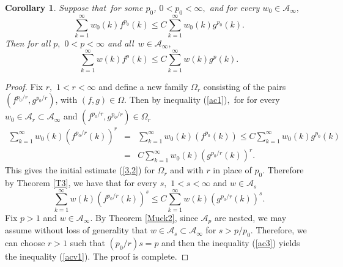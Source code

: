 \documentclass[a4paper]{amsart}
\theoremstyle{plain}
\newtheorem{corollary}{Corollary}[section]
\numberwithin{equation}{section}
\begin{document}
\begin{corollary}
Suppose that\ for some $p_{0}$, $0<p_{0}<\infty ,$ and for every $w_{0}\in 
\mathcal{A}_{\infty },$%
\begin{equation}
\sum_{k=1}^{\infty }w_{0}(k)f^{p_{0}}(k)\leq C\sum_{k=1}^{\infty
}w_{0}(k)g^{p_{0}}(k)\text{.}  \label{ac1}
\end{equation}%
Then for all $p,$ $0<p<\infty $ and all\ $w\in \mathcal{A}_{\infty },$%
\begin{equation}
\sum_{k=1}^{\infty }w(k)f^{p}(k)\leq C\sum_{k=1}^{\infty }w(k)g^{p}(k).
\label{acv1}
\end{equation}
\end{corollary}

\begin{proof}
Fix $r,$ $1<r<\infty $ and define a new family $\Omega _{r}$ consisting of
the pairs $(f^{p_{0}/r},g^{p_{0}/r})$, with $(f,g)\in \Omega .$ Then by
inequality (\ref{ac1})$,$ for for every $w_{0}\in \mathcal{A}_{r}\subset 
\mathcal{A}_{\infty }$ and $(f^{p_{0}/r},g^{p_{0}/r})\in \Omega _{r}$%
\begin{eqnarray*}
\sum_{k=1}^{\infty }w_{0}(k)\left( f^{p_{0}/r}(k)\right) ^{r}
&=&\sum_{k=1}^{\infty }w_{0}(k)\left( f^{p_{0}}(k)\right) \leq
C\sum_{k=1}^{\infty }w_{0}(k)g^{p_{0}}(k) \\
&=&C\sum_{k=1}^{\infty }w_{0}(k)\left( g^{p_{0}/r}(k)\right) ^{r}.
\end{eqnarray*}%
This gives the initial estimate (\ref{3,2}) for $\Omega _{r}$ and with $r$
in place of $p_{0}.$ Therefore by Theorem \ref{T3}, we have that for every $%
s,$ $1<s<\infty $ and $w\in \mathcal{A}_{s}$%
\begin{equation}
\sum_{k=1}^{\infty }w(k)\left( f^{p_{0}/r}(k)\right) ^{s}\leq
C\sum_{k=1}^{\infty }w(k)\left( g^{p_{0}/r}(k)\right) ^{s}.  \label{ac3}
\end{equation}%
Fix $p>1$ and $w\in \mathcal{A}_{\infty }.$ By Theorem \ref{Muck2}, since $%
\mathcal{A}_{p}$ are nested, we may assume without loss of generality that $%
w\in \mathcal{A}_{s}\subset \mathcal{A}_{\infty }$ for $s>p/p_{0}.$
Therefore, we can choose $r>1$ such that $\left( p_{0}/r\right) s=p$ and
then the inequality (\ref{ac3}) yields the inequality (\ref{acv1}). The
proof is complete.
\end{proof}
\end{document}
